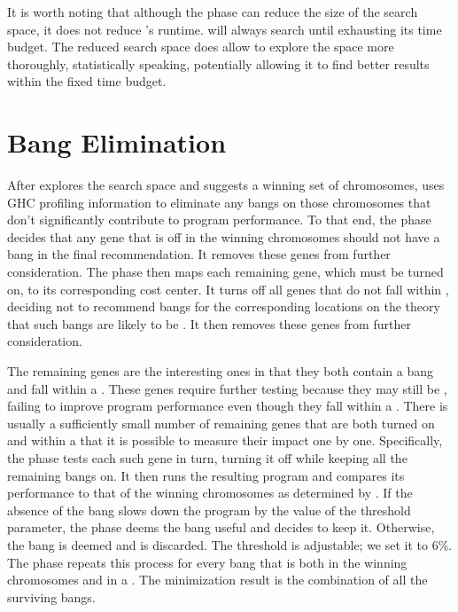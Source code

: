 It is worth noting that although the \preopt{} phase can reduce the
size of the search space, it does not reduce \Ao{}'s runtime.
\Ao{} will always search until exhausting its time budget.
The reduced search space does allow \Ao{} to explore the space
more thoroughly, statistically speaking, potentially allowing it to
find better results within the fixed time budget.


\section{\Postopt{} Bang Elimination}

After \Ao{} explores the search space and suggests a winning set of
chromosomes, \At{} uses GHC profiling information to eliminate any
bangs on those chromosomes that don't significantly contribute to
program performance. To that end,
the \postopt{} phase decides that any gene that is off in the winning
chromosomes should not have a bang in the final recommendation.
It removes these genes from further consideration.
The \postopt{} phase then maps each remaining gene, which must be
turned on, to its corresponding cost center.  It turns off all genes
that do not fall within \hotspots{}, deciding not to recommend bangs
for the corresponding locations on the theory that such bangs are
likely to be \useless{}.  It then removes these genes from further
consideration.

The remaining genes are the interesting ones in that they both
contain a bang and fall within a \hotspot{}. These genes require
further testing because they may still be \useless{}, failing to
improve program performance even though they fall within a \hotspot{}.
There is usually a sufficiently small number of remaining genes that
are both turned on and within a \hotspot{} that it is possible to
measure their impact one by one. Specifically,
the \postopt{} phase tests each such gene in turn, turning
it off while keeping all the remaining bangs on.  It
then runs the resulting program and compares its performance to that
of the winning chromosomes as determined by \Ao{}.
If the absence of the bang slows down the program by the value of the \absim{}
threshold parameter, the \postopt{} phase deems the bang useful and
decides to keep it.
Otherwise, the bang is deemed \useless{} and is
discarded. The \absim{} threshold is adjustable; we set it to
6\%. The \postopt{} phase repeats this process for every bang
that is both in the winning chromosomes and in a \hotspot{}.
The minimization result is the combination of all the surviving
bangs.

